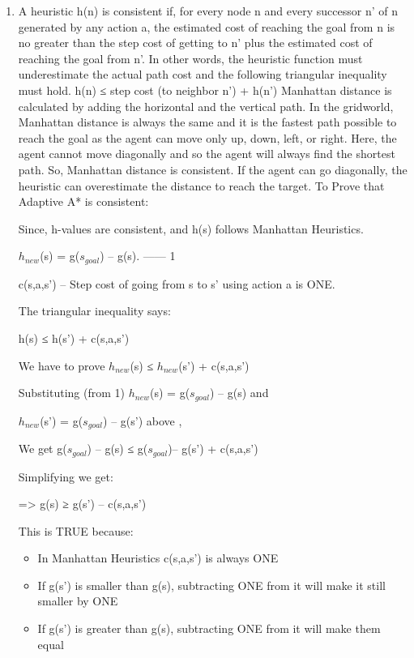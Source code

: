 \documentclass[12pt]{article}
\begin{document}
 \begin{enumerate}[label=\alph*]
    \item
    \begin{flushleft}

   A heuristic h(n) is consistent if, for every node n and every successor n’ of n generated by any action a, the estimated cost of reaching the goal from n is no greater than the step cost of getting to n’ plus the estimated cost of reaching the goal from n’. In other words, the heuristic function must underestimate the actual path cost and the following triangular inequality must hold.
   \vskip 0.5cm
\hspace {2em}     
h(n) ≤ step cost (to neighbor n’) + h(n’)
\vskip 0.5cm
     Manhattan distance is calculated by adding the horizontal and the vertical path.
In the gridworld, Manhattan distance is always the same and it is the fastest path 
possible to reach the goal as the agent can move only up, down, left, or right. 
Here, the agent cannot move diagonally and so the agent will always find the 
shortest path. So, Manhattan distance is consistent. If the agent can go diagonally, 
the heuristic can overestimate the distance to reach the target.
\vskip 0.5cm
To Prove that Adaptive A* is consistent:

Since, h-values are consistent, and h(s) follows Manhattan Heuristics.
   \begin{spacing}{2}
$h_{new}$(s) = g($s_{goal}$)  –  g(s).     ------ 1

c(s,a,s’) – Step cost of going from s to s’ using action a is ONE.

The triangular inequality says:

\hspace {2em}
h(s) ≤ h(s’) + c(s,a,s’)

We have to prove $h_{new}$(s) ≤ $h_{new}$(s’) + c(s,a,s’)

Substituting (from 1) 
$h_{new}$(s) = g($s_{goal}$) – g(s) and
 
$h_{new}$(s’) = g($s_{goal}$) –  g(s’) above ,

We get g($s_{goal}$) – g(s) ≤ g($s_{goal}$)– g(s’) + c(s,a,s’)

Simplifying we get:

=> g(s) ≥ g(s’) – c(s,a,s’)
\end{spacing}
This is TRUE because:

\begin{itemize}
    \item In Manhattan Heuristics c(s,a,s’) is always ONE
    \item If g(s’) is smaller than g(s), subtracting ONE from it will make it still smaller by ONE
    \item If g(s’) is greater than g(s), subtracting ONE from it will make them equal
\end{itemize}


\end{flushleft}
\end{enumerate}
\end{document}
